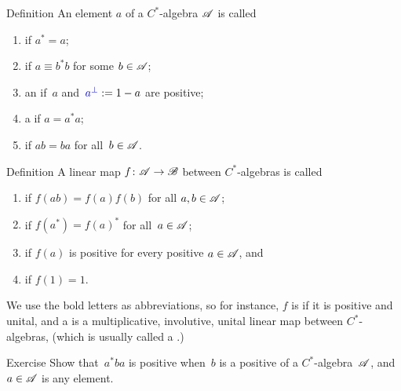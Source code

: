 \documentclass[main]{subfiles}
\begin{document}
\begin{parsec}%
\begin{point}{Definition}
An element $a$ of a $C^*$-algebra $\mathscr{A}$ is called
\begin{enumerate}
\item {} if $a^* =a$;
\item {}
if $a\equiv b^*b$ for some $b\in \mathscr{A}$;
\item an  if~$a$ and~$\define{a^\perp}:=1-a$ are positive;
\item a  if $a=a^*a$;
\item {} if $ab=ba$ for all~$b\in\mathscr{A}$.
\end{enumerate}
\end{point}
\end{parsec}
%
%
\begin{parsec}
\begin{point}{Definition}
A linear map $f\colon \mathscr{A} \to \mathscr{B}$
between $C^*$-algebras
is called
\begin{enumerate}
\item
{}
if $f(ab)=f(a)f(b)$ for all $a,b\in\mathscr{A}$;
\item
{}
if $f(a^*)=f(a)^*$ for all~$a\in\mathscr{A}$;
\item
{}
if $f(a)$ is positive
for every positive $a\in\mathscr{A}$, and
\item
{}
if $f(1)=1$.
\end{enumerate}
\end{point}
\begin{point}%
We use the bold letters as abbreviations,
so for instance,
$f$ is  if it is positive and unital,
and a 
is a multiplicative, involutive, unital linear map between $C^*$-algebras,
(which is usually called a .)
\end{point}
\end{parsec}
%
%
%
\begin{parsec}[ad-monotone]%
\begin{point}{Exercise}%
Show that~$a^*ba$
is positive
when~$b$ is a positive of a $C^*$-algebra~$\mathscr{A}$,
and $a\in \mathscr{A}$ is any element.
\end{point}
\end{parsec}
\end{document}
